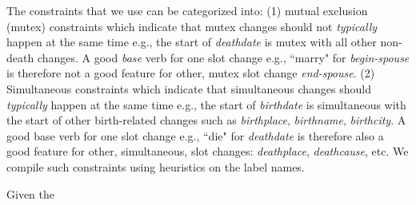 The constraints that we use can be categorized into: (1) mutual exclusion (mutex) constraints which indicate that mutex changes should not \textit{typically} happen at the same time e.g., the start of \textit{deathdate} is mutex with all other non-death changes. %
A good \textit{base} verb for one slot change e.g., ``marry" for \textit{begin-spouse} is therefore not a good feature for other, mutex slot change \textit{end-spouse}. (2) Simultaneous constraints which indicate that simultaneous changes should \textit{typically} happen at the same time e.g., the start of \textit{birthdate} is simultaneous with the start of other birth-related changes such as \textit{birthplace}, \textit{birthname}, \textit{birthcity}. A good base verb for one slot change e.g., ``die" for \textit{deathdate} is therefore also a good feature for other, simultaneous, slot changes: \textit{deathplace}, \textit{deathcause}, etc. We compile such constraints using heuristics on the label names.%

Given the 